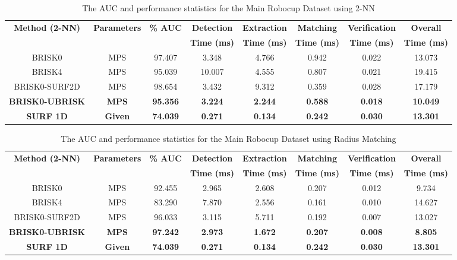 \documentclass[11pt]{report}
\begin{document}
\begin{table}
\caption{The AUC and performance statistics for the Main Robocup Dataset using
2-NN}
\footnotesize
\begin{tabular}{|c|c|c|c|c|c|c|c|}
\hline 
\textbf{Method (2-NN)} & \textbf{Parameters} & \textbf{\% AUC} & \textbf{Detection} & \textbf{Extraction} & \textbf{Matching} & \textbf{Verification} & \textbf{Overall}\tabularnewline
 &  &  & \textbf{Time (ms)} & \textbf{Time (ms)} & \textbf{Time (ms)} & \textbf{Time (ms)} & \textbf{Time (ms)}\tabularnewline
\hline 
\hline 
BRISK0 & MPS & 97.407 & 3.348 & 4.766 & 0.942 & 0.022 & 13.073\tabularnewline
\hline 
BRISK4 & MPS & 95.039 & 10.007 & 4.555 & 0.807 & 0.021 & 19.415\tabularnewline
\hline 
BRISK0-SURF2D & MPS & 98.654 & 3.432 & 9.312 & 0.359 & 0.028 & 17.179\tabularnewline
\hline 
\textbf{BRISK0-UBRISK} & \textbf{MPS} & \textbf{95.356} & \textbf{3.224} & \textbf{2.244} & \textbf{0.588} & \textbf{0.018} & \textbf{10.049}\tabularnewline
\hline 
\textbf{SURF 1D} & \textbf{Given} & \textbf{74.039} & \textbf{0.271} & \textbf{0.134} & \textbf{0.242} & \textbf{0.030} & \textbf{13.301}\tabularnewline
\hline 
\end{tabular}
\label{tab:mrd_times_knn}
\end{table}

\begin{table}
\caption{The AUC and performance statistics for the Main Robocup Dataset using
Radius Matching}
\footnotesize
\begin{tabular}{|c|c|c|c|c|c|c|c|}
\hline 
\textbf{Method (2-NN)} & \textbf{Parameters} & \textbf{\% AUC} & \textbf{Detection} & \textbf{Extraction} & \textbf{Matching} & \textbf{Verification} & \textbf{Overall}\tabularnewline
 &  &  & \textbf{Time (ms)} & \textbf{Time (ms)} & \textbf{Time (ms)} & \textbf{Time (ms)} & \textbf{Time (ms)}\tabularnewline
\hline 
\hline 
BRISK0 & MPS & 92.455 & 2.965 & 2.608 & 0.207 & 0.012 & 9.734\tabularnewline
\hline 
BRISK4 & MPS & 83.290 & 7.870 & 2.556 & 0.161 & 0.010 & 14.627\tabularnewline
\hline 
BRISK0-SURF2D & MPS & 96.033 & 3.115 & 5.711 & 0.192 & 0.007 & 13.027\tabularnewline
\hline 
\textbf{BRISK0-UBRISK} & \textbf{MPS} & \textbf{97.242} & \textbf{2.973} & \textbf{1.672} & \textbf{0.207} & \textbf{0.008} & \textbf{8.805}\tabularnewline
\hline 
\textbf{SURF 1D} & \textbf{Given} & \textbf{74.039} & \textbf{0.271} & \textbf{0.134} & \textbf{0.242} & \textbf{0.030} & \textbf{13.301}\tabularnewline
\hline 
\end{tabular}
\label{tab:mrd_times_hamming}
\end{table}
\end{document}
